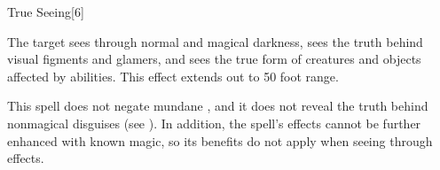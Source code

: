 \begin{spellsection}{True Seeing}[6]
    \begin{spellheader}
    \end{spellheader}
    \begin{spellcontent}
        \begin{spelltargetinginfo}
        \end{spelltargetinginfo}
        \begin{spelleffects}
            \spelleffect The target sees through normal and magical darkness, sees the truth behind visual figments and glamers, and sees the true form of creatures and objects affected by  abilities.
            This effect extends out to 50 foot range.
            \spelldur \durshort
        \end{spelleffects}
    \end{spellcontent}
    \begin{spellfooter}
        \spellnotes This spell does not negate mundane , and it does not reveal the truth behind nonmagical disguises (see ). In addition, the spell's effects cannot be further enhanced with known magic, so its benefits do not apply when seeing through  effects.
        \miscastexplode
    \end{spellfooter}
    \begin{spellaugments}
    \end{spellaugments}
\end{spellsection}

